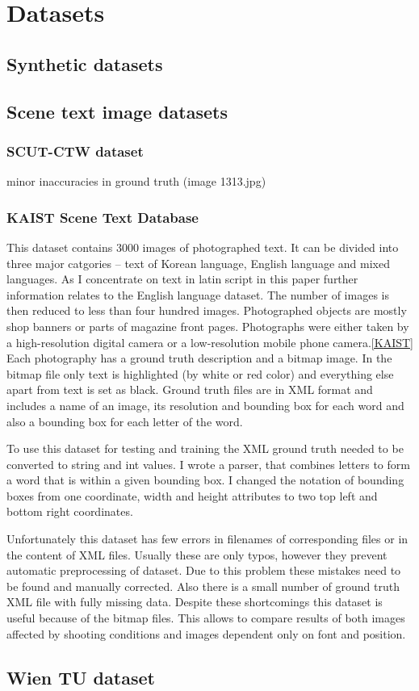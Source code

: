 \chapter{Datasets}

\section{Synthetic datasets}
\section{Scene text image datasets}
\subsection*{SCUT-CTW dataset}


minor inaccuracies in ground truth (image 1313.jpg)

\subsection*{KAIST Scene Text Database}

This dataset contains 3000 images of photographed text. It can be divided into three major catgories -- text of Korean language, English language and mixed languages. As I concentrate on text in latin script in this paper further information relates to the English language dataset. The number of images is then reduced to less than four hundred images. Photographed objects are mostly shop banners or parts of magazine front pages. Photographs were either taken by a high-resolution digital camera or a low-resolution mobile phone camera.\ref{KAIST} Each photography has a ground truth description and a bitmap image. In the bitmap file only text is highlighted (by white or red color) and everything else apart from text is set as black. Ground truth files are in XML format and includes a name of an image, its resolution and bounding box for each word and also a bounding box for each letter of the word.

To use this dataset for testing and training the XML ground truth needed to be converted to string and int values. I wrote a parser, that combines letters to form a word that is within a given bounding box. I changed the notation of bounding boxes from one coordinate, width and height attributes to two top left and bottom right coordinates.

Unfortunately this dataset has few errors in filenames of corresponding files or in the content of XML files. Usually these are only typos, however they prevent automatic preprocessing of dataset. Due to this problem these mistakes need to be found and  manually corrected. Also there is a small number of ground truth XML file with fully missing data. 
Despite these shortcomings this dataset is useful because of the bitmap files. This allows to compare results of both images affected by shooting conditions and images dependent only on font and position.

\section{Wien TU dataset}


